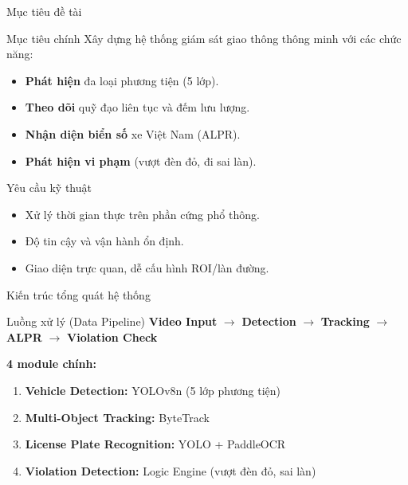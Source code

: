 \begin{frame}{Mục tiêu đề tài}
    \begin{block}{Mục tiêu chính}
    Xây dựng hệ thống giám sát giao thông thông minh với các chức năng:
    \begin{itemize}
        \item \textbf{Phát hiện} đa loại phương tiện (5 lớp).
        \item \textbf{Theo dõi} quỹ đạo liên tục và đếm lưu lượng.
        \item \textbf{Nhận diện biển số} xe Việt Nam (ALPR).
        \item \textbf{Phát hiện vi phạm} (vượt đèn đỏ, đi sai làn).
    \end{itemize}
    \end{block}

    \begin{block}{Yêu cầu kỹ thuật}
    \begin{itemize}
        \item Xử lý thời gian thực trên phần cứng phổ thông.
        \item Độ tin cậy và vận hành ổn định.
        \item Giao diện trực quan, dễ cấu hình ROI/làn đường.
    \end{itemize}
    \end{block}
\end{frame}

\begin{frame}{Kiến trúc tổng quát hệ thống}
    \begin{block}{Luồng xử lý (Data Pipeline)}
    \centering
    \textbf{Video Input} $\rightarrow$ \textbf{Detection} $\rightarrow$ \textbf{Tracking} $\rightarrow$ \textbf{ALPR} $\rightarrow$ \textbf{Violation Check}
    \end{block}

    \vspace{0.4em}
    \textbf{4 module chính:}
    \begin{enumerate}
        \item \textbf{Vehicle Detection:} YOLOv8n (5 lớp phương tiện)
        \item \textbf{Multi-Object Tracking:} ByteTrack
        \item \textbf{License Plate Recognition:} YOLO + PaddleOCR
        \item \textbf{Violation Detection:} Logic Engine (vượt đèn đỏ, sai làn)
    \end{enumerate}
\end{frame}

